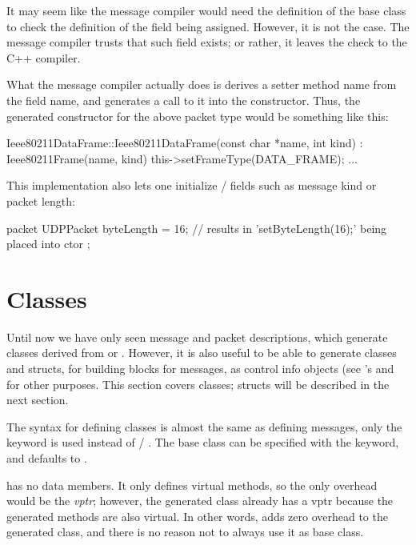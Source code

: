 It may seem like the message compiler would need the definition of the base
class to check the definition of the field being assigned. However, it is
not the case. The message compiler trusts that such field exists; or
rather, it leaves the check to the C++ compiler.

What the message compiler actually does is derives a setter method name
from the field name, and generates a call to it into the constructor.
Thus, the generated constructor for the above packet type would be
something like this:

\begin{cpp}
Ieee80211DataFrame::Ieee80211DataFrame(const char *name, int kind) :
    Ieee80211Frame(name, kind)
{
    this->setFrameType(DATA_FRAME);
    ...
}
\end{cpp}

This implementation also lets one initialize  /
 fields such as message kind or packet length:

\begin{msg}
packet UDPPacket
{
    byteLength = 16;  // results in 'setByteLength(16);' being placed into ctor
};
\end{msg}



\section{Classes}
\label{sec:msg-defs:defining-classes}

Until now we have only seen message and packet descriptions, which generate
classes derived from  or . However, it is
also useful to be able to generate classes and structs, for building blocks
for messages, as control info objects (see 's
 and for other purposes. This section covers
classes; structs will be described in the next section.

The syntax for defining classes is almost the same as defining messages,
only the  keyword is used instead of  /
. The base class can be specified with the 
keyword, and defaults to .

\begin{note}
 has no data members. It only defines virtual methods, so
the only overhead would be the \textit{vptr}; however, the generated class already has
a vptr because the generated methods are also virtual. In other words,
 adds zero overhead to the generated class, and there is no
reason not to always use it as base class.
\end{note}

